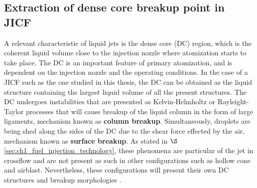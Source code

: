 %

\subsection{Extraction of dense core breakup point in JICF}
\label{subsec:ch5_jet_dense_core_extraction}

A relevant characteristic of liquid jets is the dense core (DC) region, which is the coherent liquid volume close to the injection nozzle where atomization starts to take place. The DC is an important feature of primary atomization, and is dependent on the injection nozzle and the operating conditions. In the case of a JICF such as the one studied in this thesis, the DC can be obtained as the liquid structure containing the largest liquid volume of all the present structures. The DC undergoes instabilities that are presented as Kelvin-Helmholtz or Rayleight-Taylor processes that will cause breakup of the liquid column in the form of large ligaments, mechanism known as \textbf{column breakup}. Simultaneously, droplets are being shed along the sides of the DC due to the shear force effected by the air, mechanism known as \textbf{surface breakup}. As stated in $\S$\ref{sec:ch1_fuel_injection_technology}, these phenomena are particular of the jet in crossflow and are not present as such in other configurations such as hollow cone and airblast. Nevertheless, these configurations will present their own DC structures and breakup morphologies .

